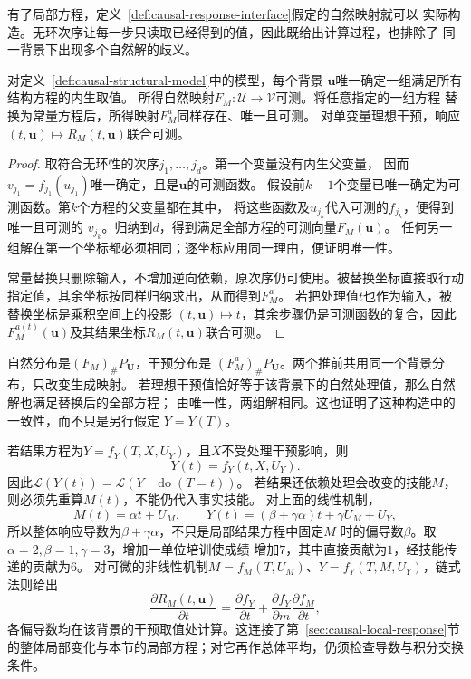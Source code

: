 有了局部方程，定义~\ref{def:causal-response-interface}假定的自然映射就可以
实际构造。无环次序让每一步只读取已经得到的值，因此既给出计算过程，也排除了
同一背景下出现多个自然解的歧义。

\begin{theorem}[无环机制的唯一可测响应]
  \label{thm:causal-acyclic-response}
  对定义~\ref{def:causal-structural-model}中的模型，每个背景
  \(\bm u\)唯一确定一组满足所有结构方程的内生取值。
  所得自然映射\(F_M:\mathcal U\to\mathcal V\)可测。将任意指定的一组方程
  替换为常量方程后，所得映射\(F_M^a\)同样存在、唯一且可测。
  对单变量理想干预，响应\((t,\bm u)\mapsto R_M(t,\bm u)\)联合可测。
\end{theorem}
\begin{proof}
  取符合无环性的次序\(j_1,\ldots,j_d\)。第一个变量没有内生父变量，
  因而\(v_{j_1}=f_{j_1}(u_{j_1})\)唯一确定，且是\(\bm u\)的可测函数。
  假设前\(k-1\)个变量已唯一确定为可测函数。第\(k\)个方程的父变量都在其中，
  将这些函数及\(u_{j_k}\)代入可测的\(f_{j_k}\)，便得到唯一且可测的
  \(v_{j_k}\)。归纳到\(d\)，得到满足全部方程的可测向量\(F_M(\bm u)\)。
  任何另一组解在第一个坐标都必须相同；逐坐标应用同一理由，便证明唯一性。

  常量替换只删除输入，不增加逆向依赖，原次序仍可使用。被替换坐标直接取行动
  指定值，其余坐标按同样归纳求出，从而得到\(F_M^a\)。
  若把处理值\(t\)也作为输入，被替换坐标是乘积空间上的投影
  \((t,\bm u)\mapsto t\)，其余步骤仍是可测函数的复合，因此
  \(F_M^{a(t)}(\bm u)\)及其结果坐标\(R_M(t,\bm u)\)联合可测。
\end{proof}

自然分布是\((F_M)_{\#}P_{\bm U}\)，干预分布是
\((F_M^a)_{\#}P_{\bm U}\)。两个推前共用同一个背景分布，只改变生成映射。
若理想干预值恰好等于该背景下的自然处理值，那么自然解也满足替换后的全部方程；
由唯一性，两组解相同。这也证明了这种构造中的一致性，而不只是另行假定
\(Y=Y(T)\)。

若结果方程为\(Y=f_Y(T,X,U_Y)\)，且\(X\)不受处理干预影响，则
\begin{equation}
  Y(t)=f_Y(t,X,U_Y).
  \label{eq:causal-scm-potential-outcome}
\end{equation}
因此\(\mathcal L(Y(t))=\mathcal L(Y\mid\operatorname{do}(T=t))\)。
若结果还依赖处理会改变的技能\(M\)，则必须先重算\(M(t)\)，不能仍代入事实技能。
对上面的线性机制，
\[
  M(t)=\alpha t+U_M,\qquad
  Y(t)=(\beta+\gamma\alpha)t+\gamma U_M+U_Y,
\]
所以整体响应导数为\(\beta+\gamma\alpha\)，不只是局部结果方程中固定\(M\)
时的偏导数\(\beta\)。取\(\alpha=2,\beta=1,\gamma=3\)，增加一单位培训使成绩
增加\(7\)，其中直接贡献为\(1\)，经技能传递的贡献为\(6\)。
对可微的非线性机制\(M=f_M(T,U_M)\)、\(Y=f_Y(T,M,U_Y)\)，链式法则给出
\[
  \frac{\partial R_M(t,\bm u)}{\partial t}
  =
  \frac{\partial f_Y}{\partial t}
  +
  \frac{\partial f_Y}{\partial m}
  \frac{\partial f_M}{\partial t},
\]
各偏导数均在该背景的干预取值处计算。这连接了第~\ref{sec:causal-local-response}节
的整体局部变化与本节的局部方程；对它再作总体平均，仍须检查导数与积分交换条件。

